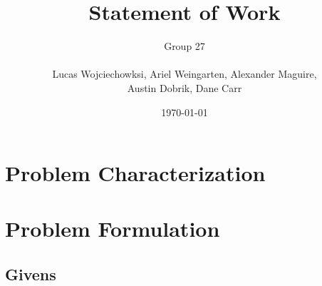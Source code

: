 \documentclass[a4paper]{article}
\title{Statement of Work}
\author{
	Group 27 \\
	\\
	Lucas Wojciechowksi, Ariel Weingarten, Alexander Maguire, \\
	Austin Dobrik, Dane Carr}
\date{\today}
\begin{document}
\maketitle

\section{Problem Characterization}



%

\section{Problem Formulation}

%
%

\subsection{Givens}
\end{document}
